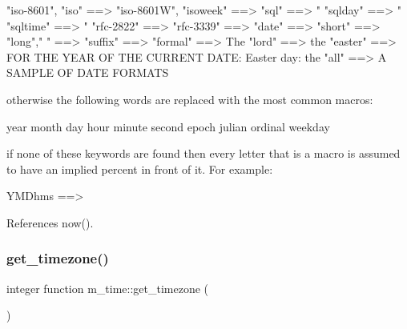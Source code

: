 \begin{DoxyVerb}
  "iso-8601",
  "iso"        ==> %
  "iso-8601W",
  "isoweek"    ==> %
  "sql"        ==> "%
  "sqlday"     ==> "%
  "sqltime"    ==> "%
  "rfc-2822"   ==> %
  "rfc-3339"   ==> %
  "date"       ==> %
  "short"      ==> %
  "long"," "   ==> %
  "suffix"     ==> %
  "formal"     ==> The %
  "lord"       ==> the %
  "easter"     ==> FOR THE YEAR OF THE CURRENT DATE:
                   Easter day: the %
  "all"        ==> A SAMPLE OF DATE FORMATS

otherwise the following words are replaced with the most
common macros:

   year     %
   month    %
   day      %
   hour     %
   minute   %
   second   %
   epoch    %
   julian   %
   ordinal  %
   weekday  %

if none of these keywords are found then every letter that
is a macro is assumed to have an implied percent in front
of it. For example:

   YMDhms ==> %
 

References now().

\mbox{\label{namespacem__time_a7903410a1d28bcdf3d33ab0c2d74b124}} 
\subsubsection{\texorpdfstring{get\+\_\+timezone()}{get\_timezone()}}
{\footnotesize\ttfamily integer function m\+\_\+time\+::get\+\_\+timezone (\begin{DoxyParamCaption}{ }\end{DoxyParamCaption})\hspace{0.3cm}{\ttfamily [private]}}

\mbox{\label{namespacem__time_aa5198c7aa4f3d8411c8ce93046ce3794}} 

\end{DoxyVerb}

